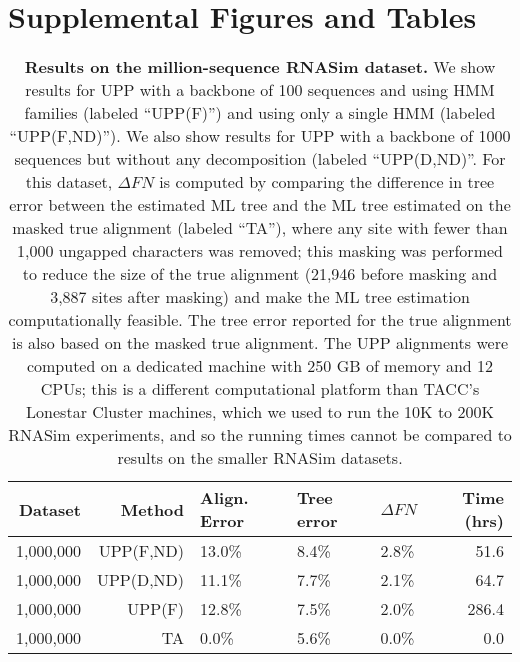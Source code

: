 \clearpage

\section{Supplemental Figures and Tables}

\begin{table}[htpb]
\caption[Performance of UPP variants on the million-sequence RNASim dataset.]{\label{alignment_large}  
{\bf Results on the million-sequence RNASim dataset.}
We show results for UPP with a backbone of 100 sequences and using HMM families (labeled ``UPP(F)'') and using only a single HMM (labeled ``UPP(F,ND)'').
We also show results for UPP with a backbone of 1000 sequences
but without any decomposition (labeled  ``UPP(D,ND)''.  For
this dataset,  $\Delta{FN}$ is computed by comparing 
the difference in tree error between 
the estimated ML tree and the ML 
tree estimated on the masked true alignment (labeled ``TA''), where
any site with fewer than 1,000 ungapped characters was removed;
this masking was performed to reduce the size of the true alignment (21,946 before masking and 3,887 sites after masking) and make the ML tree estimation computationally feasible.  The tree error reported for the true alignment is also based on the masked true alignment.
The UPP alignments were computed on a dedicated
machine with 250 GB of memory and 12 CPUs; this is
a different computational platform than TACC's Lonestar Cluster machines, which we used to run the 
10K to 200K RNASim experiments, and so the running times
cannot be compared to results on the smaller RNASim datasets.}
   \centering
   \begin{tabular}{|r|r|l|l|l|r|}
   \hline
   Dataset & Method               & Align. Error &Tree error &$\Delta{FN}$& Time (hrs)\\
   \hline
   1,000,000 & UPP(F,ND)    & 13.0\%       &   8.4\% & 2.8\%& 51.6                           \\
   1,000,000 & UPP(D,ND)        & 11.1\%     &    7.7\%&   2.1\%& 64.7                           \\
   \hline
   1,000,000 & UPP(F)        & 12.8\%     &   7.5\%  &  2.0\%& 286.4\\
   \hline   
   1,000,000 & TA        & 0.0\%     &   5.6\%  &  0.0\%& 0.0\\
   \hline   
   
   \end{tabular}
\end{table}

